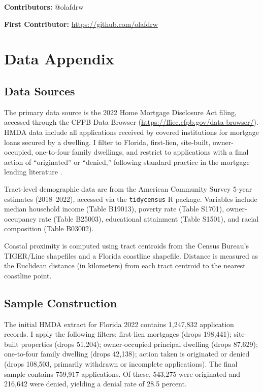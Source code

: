 \documentclass[12pt]{article}
\begin{document}
\noindent\textbf{Contributors:} @olafdrw

\noindent\textbf{First Contributor:} \url{https://github.com/olafdrw}

\label{apep_main_text_end}
\newpage


\newpage
\appendix

\section{Data Appendix}
\label{app:data}

\subsection{Data Sources}

The primary data source is the 2022 Home Mortgage Disclosure Act filing, accessed through the CFPB Data Browser (\url{https://ffiec.cfpb.gov/data-browser/}). HMDA data include all applications received by covered institutions for mortgage loans secured by a dwelling. I filter to Florida, first-lien, site-built, owner-occupied, one-to-four family dwellings, and restrict to applications with a final action of ``originated'' or ``denied,'' following standard practice in the mortgage lending literature \citep{munnell1996mortgage, bhutta2021minorities}.

Tract-level demographic data are from the American Community Survey 5-year estimates (2018--2022), accessed via the \texttt{tidycensus} R package. Variables include median household income (Table B19013), poverty rate (Table S1701), owner-occupancy rate (Table B25003), educational attainment (Table S1501), and racial composition (Table B03002).

Coastal proximity is computed using tract centroids from the Census Bureau's TIGER/Line shapefiles and a Florida coastline shapefile. Distance is measured as the Euclidean distance (in kilometers) from each tract centroid to the nearest coastline point.

\subsection{Sample Construction}

The initial HMDA extract for Florida 2022 contains 1,247,832 application records. I apply the following filters: first-lien mortgages (drops 198,441); site-built properties (drops 51,204); owner-occupied principal dwelling (drops 87,629); one-to-four family dwelling (drops 42,138); action taken is originated or denied (drops 108,503, primarily withdrawn or incomplete applications). The final sample contains 759,917 applications. Of these, 543,275 were originated and 216,642 were denied, yielding a denial rate of 28.5 percent.
\end{document}

